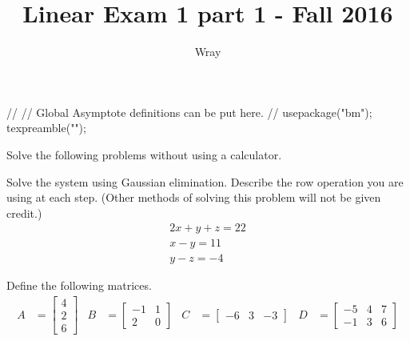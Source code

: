 \documentclass[addpoints, 12pt]{exam}
\title{Linear Exam 1 part 1 - Fall 2016}
\author{Wray}
\begin{document}
\begin{asydef}
//
// Global Asymptote definitions can be put here.
//
usepackage("bm");
texpreamble("\def\V#1{\bm{#1}}");
\end{asydef}

\bigskip

             
\bigskip
Solve the following problems without using a calculator.

\begin{questions}

\question[15]
Solve the system using Gaussian elimination.  Describe the row operation you are using at each step.  (Other methods of solving this problem will not be given credit.)
\begin{gather*}
	2x + y + z = 22 \\
    x - y = 11 \\
    y - z = -4
\end{gather*}

\clearpage
\question[10]
Define the following matrices.
\begin{align*}
A & = \left[ \begin{array}{c}
	4 \\ 2 \\ 6
\end{array}
\right]
& B & = \left[ \begin{array}{cc}
	-1 & 1 \\ 
    2 & 0
\end{array}
\right] 
& C & = \left[ \begin{array}{ccc}
	-6 & 3 & -3
\end{array}
\right] 
& D & = \left[ \begin{array}{ccc}
	-5 & 4 & 7 \\ 
    -1 & 3 & 6
\end{array}
\right]
\end{align*}
\bigskip
{}
\end{questions}
\end{document}
